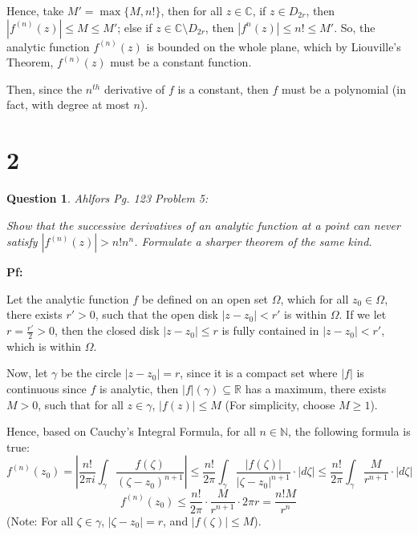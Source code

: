\documentclass{article}
\newtheorem{question}{Question}
\begin{document}
Hence, take $M'=\max\{M, n!\}$, then for all $z\in\mathbb{C}$, if $z\in D_{2r}$, then $|f^{(n)}(z)| \leq M \leq M'$; else if $z\in \mathbb{C}\setminus D_{2r}$, then $|f^{n}(z)| \leq n! \leq M'$.
So, the analytic function $f^{(n)}(z)$ is bounded on the whole plane, which by Liouville's Theorem, $f^{(n)}(z)$ must be a constant function.

Then, since the $n^{th}$ derivative of $f$ is a constant, then $f$ must be a polynomial (in fact, with degree at most $n$).

\break

\section*{2}
\begin{myBox}[]{}
    \begin{question}
        Ahlfors Pg. 123 Problem 5:

        Show that the successive derivatives of an analytic function at a
        point can never satisfy $|f^{(n)}(z)| > n!n^n$. Formulate a sharper theorem of
        the same kind.
    \end{question}
\end{myBox}

\textbf{Pf:}

Let the analytic function $f$ be defined on an open set $\Omega$, which for all $z_0\in\Omega$, 
there exists $r'>0$, such that the open disk $|z-z_0| < r'$ is within $\Omega$. If we let $r=\frac{r'}{2}>0$,
then the closed disk $|z-z_0|\leq r$ is fully contained in $|z-z_0|<r'$, which is within $\Omega$.

\hfill

Now, let $\gamma$ be the circle $|z-z_0|=r$, since it is a compact set where $|f|$ is continuous since $f$ is analytic,
then $|f|(\gamma)\subseteq \mathbb{R}$ has a maximum, there exists $M>0$, such that for all $z\in \gamma$, $|f(z)|\leq M$ (For simplicity, choose $M\geq 1$).

Hence, based on Cauchy's Integral Formula, for all $n\in\mathbb{N}$, the following formula is true:
$$f^{(n)}(z_0) = \left|\frac{n!}{2\pi i}\int_{\gamma}\frac{f(\zeta)}{(\zeta-z_0)^{n+1}}\right| \leq \frac{n!}{2\pi}\int_{\gamma}\frac{|f(\zeta)|}{|\zeta-z_0|^{n+1}}\cdot|d\zeta| \leq \frac{n!}{2\pi}\int_{\gamma}\frac{M}{r^{n+1}}\cdot|d\zeta|$$
$$f^{(n)}(z_0) \leq \frac{n!}{2\pi} \cdot \frac{M}{r^{n+1}}\cdot 2\pi r = \frac{n!M}{r^n}$$
(Note: For all $\zeta\in \gamma$, $|\zeta-z_0|=r$, and $|f(\zeta)|\leq M$).
\end{document}

